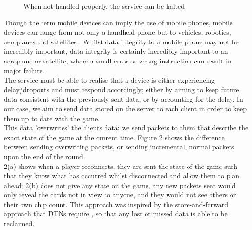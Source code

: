 \documentclass[11pt]{article}
\begin{document}
\noindent
	\begin{figure}[h]
%
\caption{When not handled properly, the service can be halted}
	\end{figure} 

\newpage
Though the term mobile devices can imply the use of mobile phones, mobile devices can range from not only a handheld phone but to vehicles, robotics, aeroplanes and satellites \citep{goth_ieee}. Whilst data integrity to a mobile phone may not be incredibly important, data integrity is certainly incredibly important to an aeroplane or satellite, where a small error or wrong instruction can result in major failure. \\

The service must be able to realise that a device is either experiencing delay/dropouts and must respond accordingly; either by aiming to keep future data consistent with the previously sent data, or by accounting for the delay. In our case, we aim to send data stored on the server to each client in order to keep them up to date with the game. \\

This data 'overwrites' the clients data: we send packets to them that describe the exact state of the game at the current time. Figure 2 shows the difference between sending overwriting packets, or sending incremental, normal packets upon the end of the round. \\

2(a) shows when a player reconnects, they are sent the state of the game such that they know what has occurred whilst disconnected and allow them to plan ahead; 2(b) does not give any state on the game, any new packets sent would only reveal the cards not in view to anyone, and they would not see others or their own chip count. This approach was inspired by the store-and-forward approach that DTNs require \cite{ieee_storefwd}, so that any lost or missed data is able to be reclaimed.\\
\end{document}
